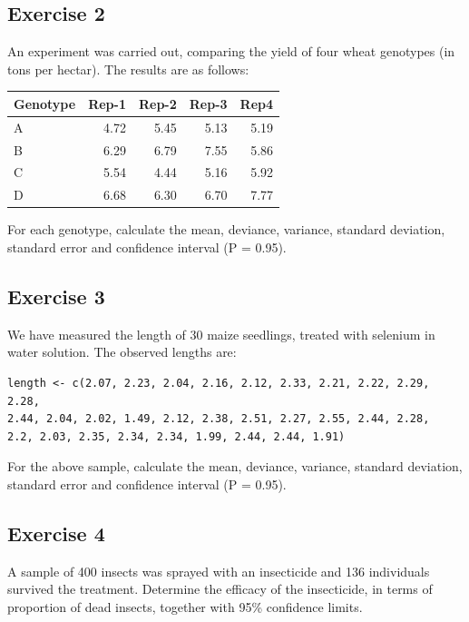 \documentclass[a4paper,12pt,oneside]{book}
\begin{document}
\hypertarget{exercise-2-2}{%
\subsection{Exercise 2}\label{exercise-2-2}}

An experiment was carried out, comparing the yield of four wheat genotypes (in tons per hectar). The results are as follows:

\begin{tabular}{l|r|r|r|r}
\hline
Genotype & Rep-1 & Rep-2 & Rep-3 & Rep4\\
\hline
A & 4.72 & 5.45 & 5.13 & 5.19\\
\hline
B & 6.29 & 6.79 & 7.55 & 5.86\\
\hline
C & 5.54 & 4.44 & 5.16 & 5.92\\
\hline
D & 6.68 & 6.30 & 6.70 & 7.77\\
\hline
\end{tabular}

For each genotype, calculate the mean, deviance, variance, standard deviation, standard error and confidence interval (P = 0.95).

\hypertarget{exercise-3-2}{%
\subsection{Exercise 3}\label{exercise-3-2}}

We have measured the length of 30 maize seedlings, treated with selenium in water solution. The observed lengths are:

\begin{verbatim}
length <- c(2.07, 2.23, 2.04, 2.16, 2.12, 2.33, 2.21, 2.22, 2.29, 2.28, 
2.44, 2.04, 2.02, 1.49, 2.12, 2.38, 2.51, 2.27, 2.55, 2.44, 2.28, 
2.2, 2.03, 2.35, 2.34, 2.34, 1.99, 2.44, 2.44, 1.91)
\end{verbatim}

For the above sample, calculate the mean, deviance, variance, standard deviation, standard error and confidence interval (P = 0.95).

\hypertarget{exercise-4-1}{%
\subsection{Exercise 4}\label{exercise-4-1}}

A sample of 400 insects was sprayed with an insecticide and 136 individuals survived the treatment. Determine the efficacy of the insecticide, in terms of proportion of dead insects, together with 95\% confidence limits.
\end{document}
